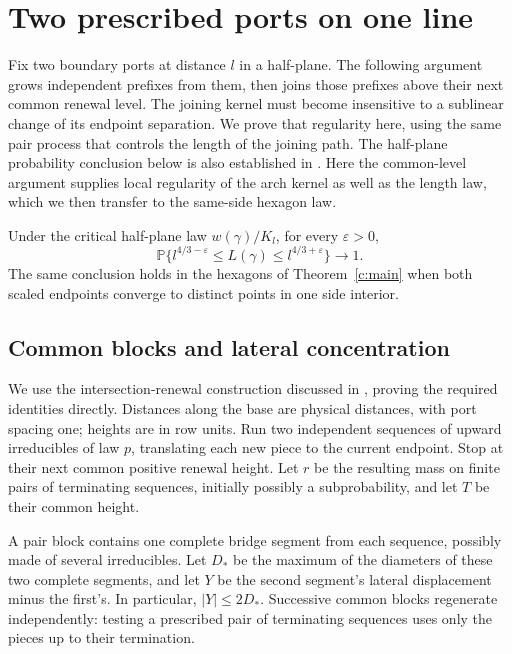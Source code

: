 \section{Two prescribed ports on one line}\label{c:same-side}
Fix two boundary ports at distance $l$ in a half-plane. The following
argument grows independent prefixes from them, then joins those prefixes
above their next common renewal level. The joining kernel must become
insensitive to a sublinear change of its endpoint separation. We prove
that regularity here, using the same pair process that controls the
length of the joining path.
The half-plane probability conclusion below is also established in
\cite[Proposition~5.8]{Renewal}. Here the common-level argument supplies
local regularity of the arch kernel as well as the length law, which we
then transfer to the same-side hexagon law.

\begin{theorem}\label{c:same-side-law}
Under the critical half-plane law $w(\gamma)/K_l$, for every
$\varepsilon>0$,
\[
 \mathbb P\{l^{4/3-\varepsilon}\le L(\gamma)
                   \le l^{4/3+\varepsilon}\}\longrightarrow1.
\]
The same conclusion holds in the hexagons of Theorem~\ref{c:main} when both scaled
endpoints converge to distinct points in one side interior.
\end{theorem}
\subsection{Common blocks and lateral concentration}
We use the intersection-renewal construction discussed in
\cite[Section~1.1]{AlexanderBerger2016}, proving the required identities
directly. Distances along the base are physical distances, with port
spacing one; heights are in row units. Run two independent sequences of
upward irreducibles of law $p$, translating each new piece to the current
endpoint. Stop at their next common positive renewal height. Let $r$ be
the resulting mass on finite pairs of terminating sequences, initially
possibly a subprobability, and let $T$ be their common height.

A pair block contains one complete bridge segment from each sequence,
possibly made of several irreducibles. Let $D_*$ be the maximum of the
diameters of these two complete segments, and let $Y$ be the second
segment's lateral displacement minus the first's. In particular,
$|Y|\le2D_*$. Successive common blocks regenerate independently: testing
a prescribed pair of terminating sequences uses only the pieces up to
their termination.

